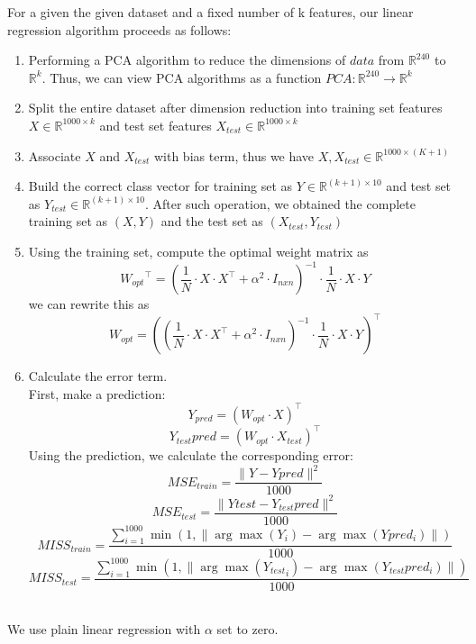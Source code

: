 \documentclass[a4paper]{article}
\begin{document}
For a given the given dataset and a fixed number of k features, our linear regression algorithm proceeds as follows: 
\begin{enumerate}
\item  Performing a PCA algorithm to reduce the dimensions of $data$ from $\mathbb{R}^{240}$ to $\mathbb{R}^{k}$. Thus, we can view PCA algorithms as a function $PCA: \mathbb{R}^{240} \to \mathbb{R}^{k}$
\item Split the entire dataset after dimension reduction into training set features $X \in \mathbb{R}^{1000 \times k}$ and test set features $X_{test} \in \mathbb{R}^{1000 \times k}$
\item Associate $X$ and $X_{test}$ with bias term, thus we have $X, X_{test} \in \mathbb{R}^{1000 \times (K + 1)}$
\item Build the correct class vector for training set as $Y \in \mathbb{R}^{(k + 1) \times 10}$ and test set as $Y_{test} \in \mathbb{R}^{(k + 1) \times 10}$. After such operation, we obtained the complete training set as $(X, Y)$ and the test set as $(X_{test}, Y_{test})$
\item Using the training set, compute the optimal weight matrix as 
$$ {W_{opt}}^\top = (\frac{1}{N} \cdot X \cdot X^\top + \alpha^2 \cdot I_{nxn})^{-1} \cdot \frac{1}{N} \cdot X \cdot Y $$
we can rewrite this as 
$$ W_{opt} = ((\frac{1}{N} \cdot X \cdot X^\top + \alpha^2 \cdot I_{nxn})^{-1} \cdot \frac{1}{N} \cdot X \cdot Y)^\top $$
\item Calculate the error term. \\
First, make a prediction: 
$$ Y_{pred} = (W_{opt} \cdot X)^\top $$
$$ Y_{test}pred = (W_{opt} \cdot X_{test})^\top $$
Using the prediction, we calculate the corresponding error:
$$ MSE_{train} = \frac{\|Y - Ypred\|^2}{1000} $$
$$ MSE_{test} = \frac{\|Ytest - Y_{test}pred\|^2}{1000} $$
$$ MISS_{train} = \frac{\sum_{i = 1}^{1000} \min(1, \|\arg\max(Y_i) - \arg\max(Ypred_i)\|)}{1000} $$
$$ MISS_{test} = \frac{\sum_{i = 1}^{1000} \min(1, \|\arg\max({Y_{test}}_i) - \arg\max(Y_{test}pred_i)\|)}{1000} $$ \\ 
\end{enumerate}

We use plain linear regression with $\alpha$ set to zero. 
\end{document}
